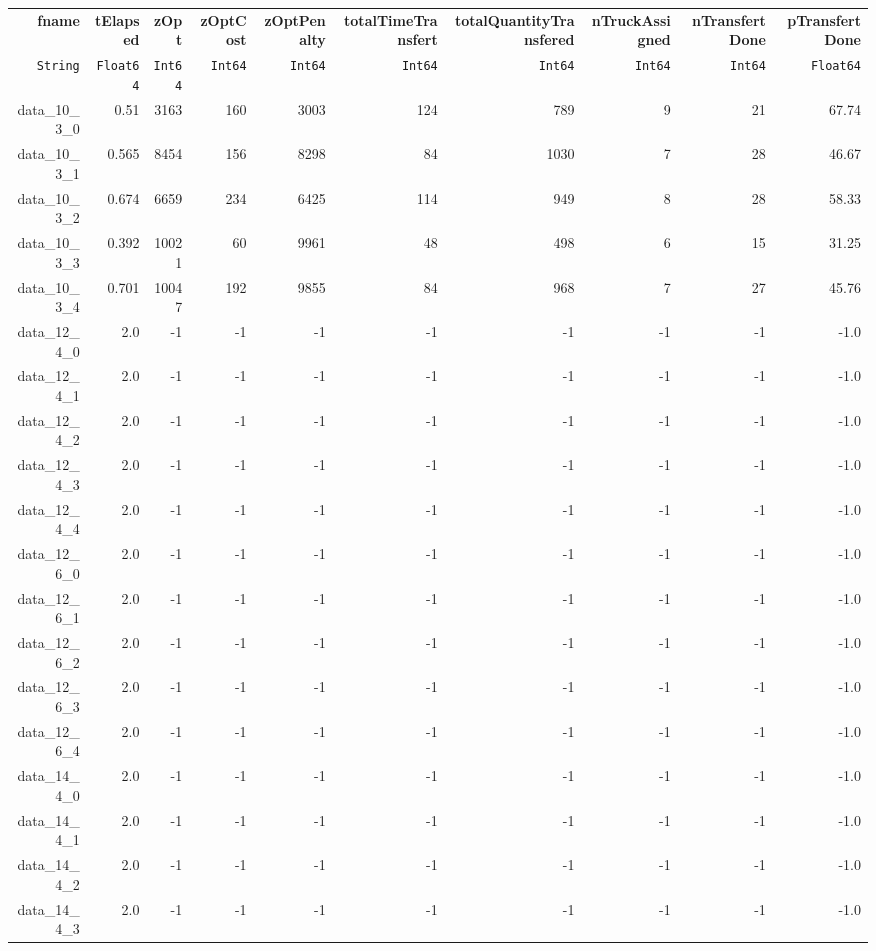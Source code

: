 \begin{tabular}{rrrrrrrrrr}
  \hline
  \textbf{fname} & \textbf{tElapsed} & \textbf{zOpt} & \textbf{zOptCost} & \textbf{zOptPenalty} & \textbf{totalTimeTransfert} & \textbf{totalQuantityTransfered} & \textbf{nTruckAssigned} & \textbf{nTransfertDone} & \textbf{pTransfertDone} \\
  \texttt{String} & \texttt{Float64} & \texttt{Int64} & \texttt{Int64} & \texttt{Int64} & \texttt{Int64} & \texttt{Int64} & \texttt{Int64} & \texttt{Int64} & \texttt{Float64} \\\hline
  data\_10\_3\_0 & 0.51 & 3163 & 160 & 3003 & 124 & 789 & 9 & 21 & 67.74 \\
  data\_10\_3\_1 & 0.565 & 8454 & 156 & 8298 & 84 & 1030 & 7 & 28 & 46.67 \\
  data\_10\_3\_2 & 0.674 & 6659 & 234 & 6425 & 114 & 949 & 8 & 28 & 58.33 \\
  data\_10\_3\_3 & 0.392 & 10021 & 60 & 9961 & 48 & 498 & 6 & 15 & 31.25 \\
  data\_10\_3\_4 & 0.701 & 10047 & 192 & 9855 & 84 & 968 & 7 & 27 & 45.76 \\
  data\_12\_4\_0 & 2.0 & -1 & -1 & -1 & -1 & -1 & -1 & -1 & -1.0 \\
  data\_12\_4\_1 & 2.0 & -1 & -1 & -1 & -1 & -1 & -1 & -1 & -1.0 \\
  data\_12\_4\_2 & 2.0 & -1 & -1 & -1 & -1 & -1 & -1 & -1 & -1.0 \\
  data\_12\_4\_3 & 2.0 & -1 & -1 & -1 & -1 & -1 & -1 & -1 & -1.0 \\
  data\_12\_4\_4 & 2.0 & -1 & -1 & -1 & -1 & -1 & -1 & -1 & -1.0 \\
  data\_12\_6\_0 & 2.0 & -1 & -1 & -1 & -1 & -1 & -1 & -1 & -1.0 \\
  data\_12\_6\_1 & 2.0 & -1 & -1 & -1 & -1 & -1 & -1 & -1 & -1.0 \\
  data\_12\_6\_2 & 2.0 & -1 & -1 & -1 & -1 & -1 & -1 & -1 & -1.0 \\
  data\_12\_6\_3 & 2.0 & -1 & -1 & -1 & -1 & -1 & -1 & -1 & -1.0 \\
  data\_12\_6\_4 & 2.0 & -1 & -1 & -1 & -1 & -1 & -1 & -1 & -1.0 \\
  data\_14\_4\_0 & 2.0 & -1 & -1 & -1 & -1 & -1 & -1 & -1 & -1.0 \\
  data\_14\_4\_1 & 2.0 & -1 & -1 & -1 & -1 & -1 & -1 & -1 & -1.0 \\
  data\_14\_4\_2 & 2.0 & -1 & -1 & -1 & -1 & -1 & -1 & -1 & -1.0 \\
  data\_14\_4\_3 & 2.0 & -1 & -1 & -1 & -1 & -1 & -1 & -1 & -1.0 \\

\end{tabular}
